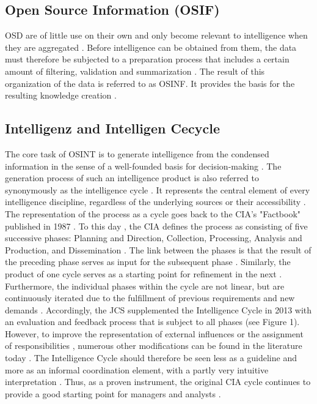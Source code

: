 \documentclass[10pt]{article}
\begin{document}
\subsection{Open Source Information (OSIF)}

OSD are of little use on their own and only become relevant to intelligence when they
are aggregated \cite{Williams.2018}. Before intelligence can be obtained from them, the
data must therefore be subjected to a preparation process that includes a certain amount
of filtering, validation and summarization
\cite{DosPassos.2017, NorthAtlanticTreatyOrganization.2001}. The result of this organization
of the data \cite{Schaurer.2010} is referred to as OSINF. It provides the basis for the
resulting knowledge creation \cite{DosPassos.2017,Schaurer.2010}.

\subsection{Intelligenz and Intelligen Cecycle}

The core task of OSINT is to generate intelligence \cite{Hwang.2022,Dokman.2020}
from the condensed information in the sense of a well-founded basis for decision-making
\cite{Breakspear.2013,May.2020}. The generation process of such an intelligence product
is also referred to synonymously as the intelligence cycle
\cite{HerreraCubides.2020, CentralIntelligenceAgency.1987}. It represents the central
element of every intelligence discipline, regardless of the underlying sources or their
accessibility \cite{Reuser.2017,Dokman.2020}. The representation of the process as a cycle
\cite{DirectorofNationalIntelligence.2011} goes back to the CIA's "Factbook" published in
1987 \cite{CentralIntelligenceAgency.1987}. To this day \cite{CentralIntelligenceAgency.2023},
the CIA defines the process as consisting of five successive phases: Planning and Direction,
Collection, Processing, Analysis and Production, and Dissemination
\cite{CentralIntelligenceAgency.1987}. The link between the phases is that the result of the
preceding phase serves as input for the subsequent phase
\cite{JointChiefsofStaffU.S.Army.2013,Pellissier.2013}. Similarly, the product of one cycle
serves as a starting point for refinement in the next \cite{Dokman.2020,Gibson.2016}.
Furthermore, the individual phases within the cycle are not linear, but are continuously
iterated due to the fulfillment of previous requirements and new demands \cite{Gibson.2016}.
Accordingly, the JCS supplemented the Intelligence Cycle in 2013 with an evaluation and
feedback process that is subject to all phases \cite{JointChiefsofStaffU.S.Army.2013}
(see Figure 1). However, to improve the representation of external influences or the
assignment of responsibilities \cite{Lowenthal.2020,Phythian.2013,Johnston.2005}, numerous
other modifications can be found in the literature today \cite{Bohm.2021,Reuser.2017}. The
Intelligence Cycle should therefore be seen less as a guideline and more as an informal
coordination element, with a partly very intuitive \cite{Breakspear.2013} interpretation
\cite{Hwang.2022}. Thus, as a proven instrument, the original CIA cycle continues to provide
a good starting point for managers and analysts
\cite{Lowenthal.2020, NorthAtlanticTreatyOrganization.2001}.
\end{document}
